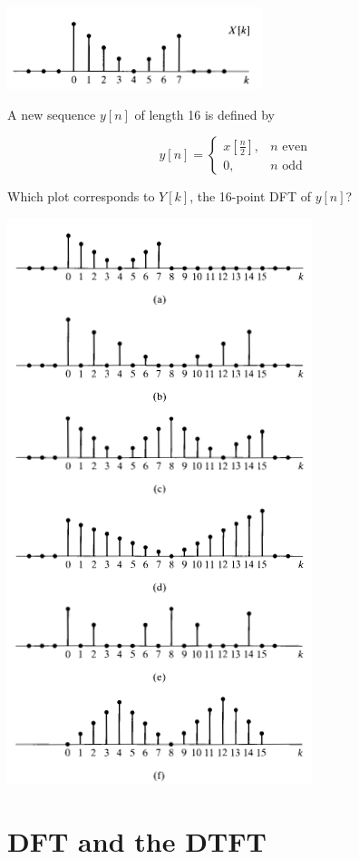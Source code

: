 \documentclass[11pt]{article}
\begin{document}
\includegraphics[scale=1]{p8-32-a.png} 

A new sequence $y[n]$ of length 16 is defined by 

\[y[n] = \begin{cases} x\left[ \frac{n}{2}\right], & n \text{ even}\\
0, & n \text{ odd} \end{cases} \]

Which plot corresponds to $Y[k]$, the 16-point DFT of $y[n]$?

\includegraphics[scale=1]{p8-32.png} 

\section{DFT and the DTFT}
\end{document}
